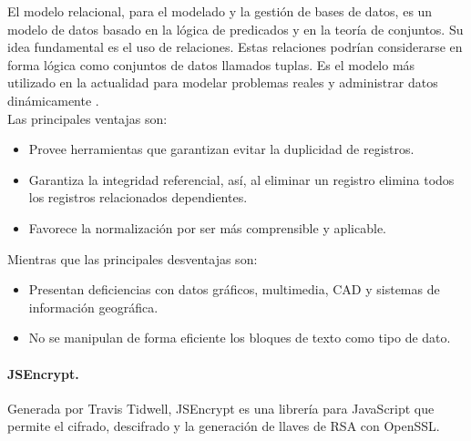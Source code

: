 \documentclass[12pt, a4paper, titlepage]{report}
\begin{document}
            El modelo relacional, para el modelado y la gestión de bases de datos, es un modelo de datos basado en la lógica de predicados y en la teoría de conjuntos.
            Su idea fundamental es el uso de relaciones. Estas relaciones podrían considerarse en forma lógica como conjuntos de datos llamados tuplas. Es el modelo más utilizado en la actualidad para modelar problemas reales y administrar datos dinámicamente \cite{refER}.\\
            
            Las principales ventajas son: 
            \begin{itemize}
                \item Provee herramientas que garantizan evitar la duplicidad de registros.
                \item Garantiza la integridad referencial, así, al eliminar un registro elimina todos los registros relacionados dependientes.
                \item Favorece la normalización por ser más comprensible y aplicable.
            \end{itemize}

            Mientras que las principales desventajas son: 
            \begin{itemize}
                \item Presentan deficiencias con datos gráficos, multimedia, CAD y sistemas de información geográfica.
                \item No se manipulan de forma eficiente los bloques de texto como tipo de dato.
            \end{itemize}
            
            \paragraph{JSEncrypt.\\}
            Generada por Travis Tidwell, JSEncrypt es una librería para JavaScript que permite el cifrado, descifrado y la generación de llaves de RSA con OpenSSL.
            
\end{document}
